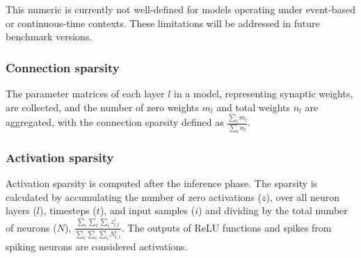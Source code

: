 This numeric is currently not well-defined for models operating under event-based or continuous-time contexts. These limitations will be addressed in future benchmark versions.

\subsubsection*{Connection sparsity} 
The parameter matrices of each layer $l$ in a model, representing synaptic weights, are collected, and the number of zero weights $m_l$ and total weights $n_l$ are aggregated, with the connection sparsity defined as $\frac{\sum_l m_l}{\sum_l n_l}$.




\subsubsection*{Activation sparsity}
Activation sparsity is computed after the inference phase. The sparsity is calculated by accumulating the number of zero activations ($z$), over all neuron layers ($l$), timesteps ($t$), and input samples ($i$) and dividing by the total number of neurons ($N$), $\frac{\sum_l \sum_t \sum_i z_{l,t}^i}{\sum_t \sum_l \sum_i N_{l,t}^i}$. 
The outputs of ReLU functions and spikes from spiking neurons are considered activations.

